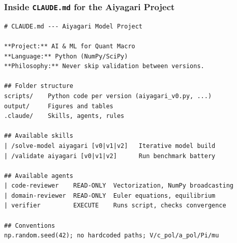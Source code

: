 \documentclass[10pt,english,aspectratio=169]{beamer}
\begin{document}
\begin{frame}[fragile]
\frametitle{Inside \texttt{CLAUDE.md} for the Aiyagari Project}

\begin{lstlisting}[style=pythonstyle,language={},basicstyle=\ttfamily\scriptsize]
# CLAUDE.md --- Aiyagari Model Project

**Project:** AI & ML for Quant Macro
**Language:** Python (NumPy/SciPy)
**Philosophy:** Never skip validation between versions.

## Folder structure
scripts/    Python code per version (aiyagari_v0.py, ...)
output/     Figures and tables
.claude/    Skills, agents, rules

## Available skills
| /solve-model aiyagari [v0|v1|v2]   Iterative model build
| /validate aiyagari [v0|v1|v2]      Run benchmark battery

## Available agents
| code-reviewer    READ-ONLY  Vectorization, NumPy broadcasting
| domain-reviewer  READ-ONLY  Euler equations, equilibrium
| verifier         EXECUTE    Runs script, checks convergence

## Conventions
np.random.seed(42); no hardcoded paths; V/c_pol/a_pol/Pi/mu
\end{lstlisting}
\end{frame}
\end{document}
